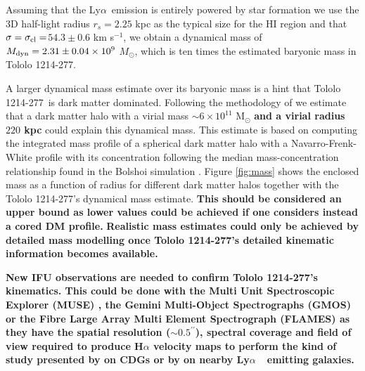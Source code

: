 \documentclass[a4paper,fleqn,usenatbib]{mnras}
\newcommand{\tol}{Tololo 1214-277}
\newcommand{\lya}{\ifmmode{{\rm Ly}\alpha}\else Ly$\alpha$\ \fi}
\newcommand{\sigmaclump}{$54.3\pm 0.6$ km s$^{-1}$}
\begin{document}
Assuming that the \lya emission is entirely powered by star formation 
we use the 3D half-light radius $r_s=2.25$ kpc as the typical size
for the HI region and that  $\sigma=\sigma_{\rm{cl}}=$\sigmaclump, we
obtain a dynamical mass of  $M_{\rm dyn}=2.31\pm0.04 \times 10^{9}$
$M_{\odot}$, which is ten times the estimated baryonic mass in
\tol. 

A larger dynamical mass estimate over its baryonic mass is a hint that
\tol\ is dark matter dominated.  
Following the methodology of \citet{2011ApJ...726..108T} we estimate
that a dark matter halo with a virial mass $\sim 6\times 10^{11}$
M$_{\odot}$ {\bf and a virial radius $220$ kpc } could explain this dynamical mass.
This estimate is based on computing the integrated mass profile of a
spherical dark matter halo with a Navarro-Frenk-White profile with its
concentration following the median mass-concentration
relationship found in the Bolshoi simulation
\citep{2012MNRAS.423.3018P,2016ApJ...832..169P}.  
Figure \ref{fig:mass} shows the enclosed mass as a function of radius
for different dark matter halos together with the \tol's dynamical
mass estimate. 
{\bf This should be considered an upper bound as lower values
  could be achieved if one considers instead a cored DM profile.}
{\bf Realistic mass estimates could only be achieved by detailed mass
  modelling once \tol's detailed kinematic information becomes
  available.}  

{\bf New IFU observations are needed to confirm \tol's kinematics.
This could be done with the Multi Unit Spectroscopic Explorer (MUSE) 
\citep{2014Msngr.157...13B}, the Gemini Multi-Object Spectrographs (GMOS) 
\citep{2004PASP..116..425H} or the Fibre Large Array Multi Element
Spectrograph (FLAMES) \citep{2002Msngr.110....1P} as they have the spatial
resolution ($\sim0.5^{\prime\prime}$), spectral coverage and field
of view required to produce H$\alpha$ velocity maps to perform the
kind of study presented by \citet{2015A&A...577A..21C} on CDGs or by
\citet{Herenz16} on nearby \lya\ emitting galaxies.}  
\end{document}
